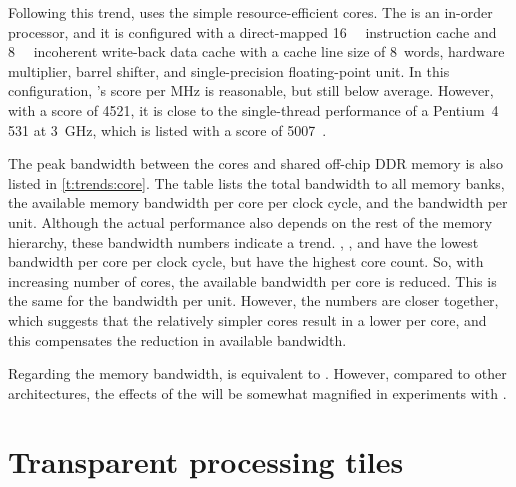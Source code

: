 Following this trend, \Starburst uses the simple resource-efficient \MicroBlaze* cores.
The \MicroBlaze is an in-order processor, and it is configured with a direct-mapped \SI{16}{\Kilo\byte} instruction cache and \SI{8}{\Kilo\byte} incoherent write-back data cache with a cache line size of 8~words, hardware multiplier, barrel shifter, and single-precision floating-point unit.
In this configuration, \Starburst's \CoreMark score per \si{\mega\hertz} is reasonable, but still below average.
However, with a score of \num{4521}, it is close to the single-thread performance of a Pentium~4 531 at \SI{3}{\giga\hertz}, which is listed with a score of \num{5007}~\cite{coremark}.

The peak bandwidth between the cores and shared off-chip \ac{DDR} memory is also listed in \vref{t:trends:core}.
The table lists the total bandwidth to all memory banks, the available memory bandwidth per core per clock cycle, and the bandwidth per \CoreMark unit.
Although the actual performance also depends on the rest of the memory hierarchy, these bandwidth numbers indicate a trend.
\TILEGx, \IntelSCC, and \Epiphany have the lowest bandwidth per core per clock cycle, but have the highest core count.
So, with increasing number of cores, the available bandwidth per core is reduced.
This is the same for the bandwidth per \CoreMark unit.
However, the numbers are closer together, which suggests that the relatively simpler cores result in a lower \CoreMark per core, and this compensates the reduction in available bandwidth.

Regarding the memory bandwidth, \Starburst is equivalent to \Epiphany.
However, compared to other architectures, the effects of the  will be somewhat magnified in experiments with \Starburst.

\section{Transparent processing tiles}


